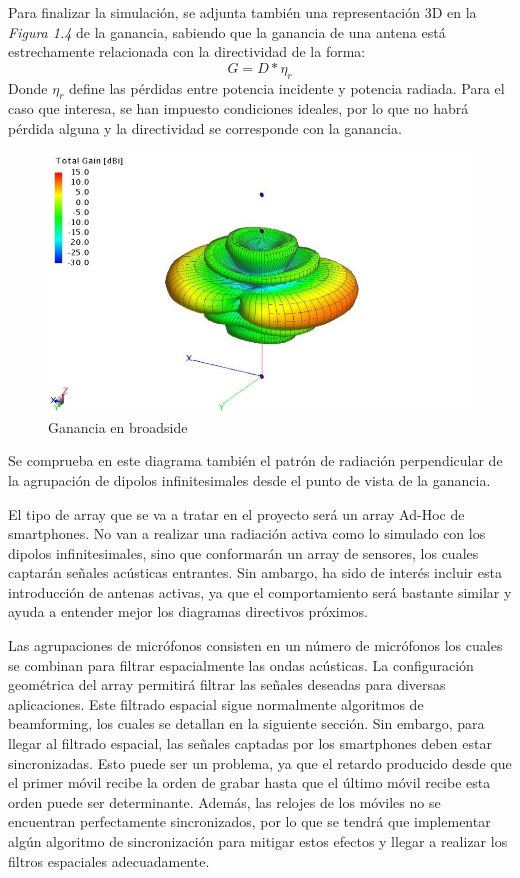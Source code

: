 \documentclass[a4paper,11pt]{book}
\begin{document}
Para finalizar la simulación, se adjunta también una representación 3D en la\textit{ Figura 1.4} de la ganancia, sabiendo que la ganancia de una antena está estrechamente relacionada con la directividad de la forma:
\begin{equation}
G = D * \eta_{r}
\end{equation}
Donde $\eta_{r}$ define las pérdidas entre potencia incidente y potencia radiada. Para el caso que interesa, se han impuesto condiciones ideales, por lo que no habrá pérdida alguna y la directividad se corresponde con la ganancia. 
\begin{figure}[hbtp]
\centering
\includegraphics[width = 12cm]{FIGURAS/ganancia_broadside.jpg}
\caption{Ganancia en broadside}
\end{figure}

Se comprueba en este diagrama también el patrón de radiación perpendicular de la agrupación de dipolos infinitesimales desde el punto de vista de la ganancia.

	 
	 El tipo de array que se va a tratar en el proyecto será un array Ad-Hoc de smartphones. No van a realizar una radiación activa como lo simulado con los dipolos infinitesimales, sino que conformarán un array de sensores, los cuales captarán señales acústicas entrantes. Sin ambargo, ha sido de interés incluir esta introducción de antenas activas, ya que el comportamiento será bastante similar y ayuda a entender mejor los diagramas directivos próximos.
	 
	  Las agrupaciones de micrófonos consisten en un número de micrófonos los cuales se combinan para filtrar espacialmente las ondas acústicas. La configuración geométrica del array permitirá filtrar las señales deseadas para diversas aplicaciones. Este filtrado espacial sigue normalmente algoritmos de beamforming, los cuales se detallan en la siguiente sección. Sin embargo, para llegar al filtrado espacial, las señales captadas por los smartphones deben estar sincronizadas. Esto puede ser un problema, ya que el retardo producido desde que el primer móvil recibe la orden de grabar hasta que el último móvil recibe esta orden puede ser determinante. Además, las relojes de los móviles no se encuentran perfectamente sincronizados, por lo que se tendrá que implementar algún algoritmo de sincronización para mitigar estos efectos y llegar a realizar los filtros espaciales adecuadamente.
	 
\end{document}
